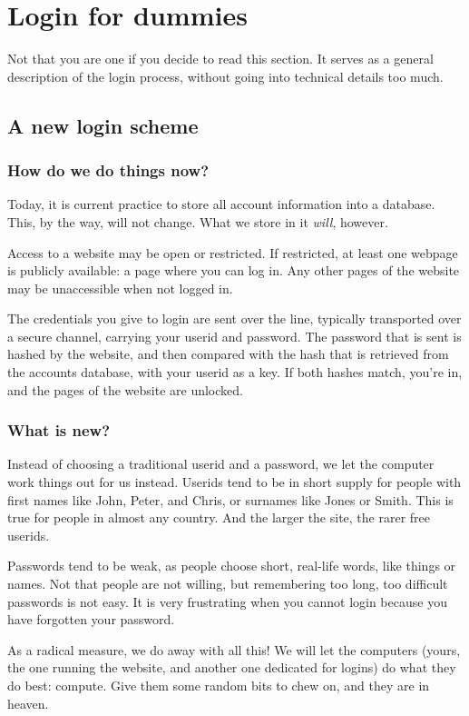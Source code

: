 \section{Login for dummies}
Not that you are one if you decide to read this section.
It serves as a general description of the login process,
without going into technical details too much.

\subsection{A new login scheme}
\subsubsection{How do we do things now?}
Today, it is current practice to store all account information into a database.
This, by the way, will not change.
What we store in it \emph{will}, however.
\par
Access to a website may be open or restricted.
If restricted, at least one webpage is publicly available: a page where you can log in.
Any other pages of the website may be unaccessible when not logged in.
\par
The credentials you give to login are sent over the line,
typically transported over a secure channel, carrying your userid and password.
The password that is sent is hashed by the website,
and then compared with the hash that is retrieved from the accounts database,
with your userid as a key.
If both hashes match, you're in, and the pages of the website are unlocked.

\subsubsection{What is new?}
Instead of choosing a traditional userid and a password,
we let the computer work things out for us instead.
Userids tend to be in short supply for people with first names like John, Peter, and Chris,
or surnames like Jones or Smith.
This is true for people in almost any country.
And the larger the site, the rarer free userids.
\par
Passwords tend to be weak,
as people choose short, real-life words, like things or names.
Not that people are not willing, but remembering too long, too difficult passwords is not easy.
It is very frustrating when you cannot login because you have forgotten your password.
\par
As a radical measure, we do away with all this!
We will let the computers
(yours, the one running the website, and another one dedicated for logins)
do what they do best: compute.
Give them some random bits to chew on, and they are in heaven.

